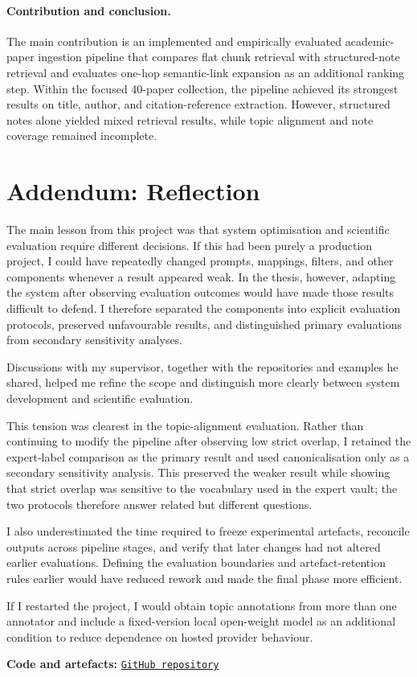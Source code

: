 \documentclass[runningheads]{llncs}
\begin{document}
\paragraph{Contribution and conclusion.}
The main contribution is an implemented and empirically evaluated
academic-paper ingestion pipeline that compares flat chunk retrieval
with structured-note retrieval and evaluates one-hop semantic-link
expansion as an additional ranking step. Within the focused 40-paper
collection, the pipeline achieved its strongest results on title,
author, and citation-reference extraction. However, structured notes
alone yielded mixed retrieval results, while topic alignment and note
coverage remained incomplete.

\section*{Addendum: Reflection}
\label{sec:reflection}

The main lesson from this project was that system optimisation and
scientific evaluation require different decisions. If this had been
purely a production project, I could have repeatedly changed prompts,
mappings, filters, and other components whenever a result appeared
weak. In the thesis, however, adapting the system after observing
evaluation outcomes would have made those results difficult to defend.
I therefore separated the components into explicit evaluation
protocols, preserved unfavourable results, and distinguished primary
evaluations from secondary sensitivity analyses.

Discussions with my supervisor, together with the repositories and
examples he shared, helped me refine the scope and distinguish more
clearly between system development and scientific evaluation.

This tension was clearest in the topic-alignment evaluation. Rather than
continuing to modify the pipeline after observing low strict overlap, I
retained the expert-label comparison as the primary result and used
canonicalisation only as a secondary sensitivity analysis. This
preserved the weaker result while showing that strict overlap was
sensitive to the vocabulary used in the expert vault; the two protocols
therefore answer related but different questions.

I also underestimated the time required to freeze experimental
artefacts, reconcile outputs across pipeline stages, and verify that
later changes had not altered earlier evaluations. Defining the
evaluation boundaries and artefact-retention rules earlier would have
reduced rework and made the final phase more efficient.

If I restarted the project, I would obtain topic annotations from more
than one annotator and include a fixed-version local open-weight model
as an additional condition to reduce dependence on hosted provider
behaviour.

\par\noindent\textbf{Code and artefacts: }
\href{https://github.com/vonargeus/llm-academic-pkm-pipeline}
{\texttt{GitHub repository}}



\end{document}
